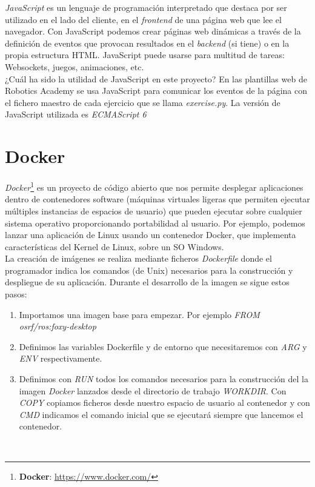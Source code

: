 \textit{JavaScript} es un lenguaje de programación interpretado que destaca por ser utilizado en el lado del cliente, en el \textit{frontend} de una página web que lee el navegador. Con JavaScript podemos crear páginas web dinámicas a través de la definición de eventos que provocan resultados en el \textit{backend} (si tiene) o en la propia estructura HTML. JavaScript puede usarse para multitud de tareas: Websockets, juegos, animaciones, etc.\\

¿Cuál ha sido la utilidad de JavaScript en este proyecto?
En las plantillas web de Robotics Academy se usa JavaScript para comunicar los eventos de la página con el fichero maestro de cada ejercicio que se llama \textit{exercise.py}. La versión de JavaScript utilizada es \textit{ECMAScript 6}



\section{Docker}
\label{sec:docker}

\textit{Docker}\footnote{\textbf{Docker}: \url{https://www.docker.com/}} es un proyecto de código abierto que nos permite desplegar aplicaciones dentro de contenedores software (máquinas virtuales ligeras que permiten ejecutar múltiples instancias de espacios de usuario) que pueden ejecutar sobre cualquier sistema operativo proporcionando portabilidad al usuario. Por ejemplo, podemos lanzar una aplicación de Linux usando un contenedor Docker, que implementa características del Kernel de Linux, sobre un SO Windows.\\

La creación de imágenes se realiza mediante ficheros \textit{Dockerfile} donde el programador indica los comandos (de Unix) necesarios para la construcción y despliegue de su aplicación. Durante el desarrollo de la imagen se sigue estos pasos:\\

\begin{enumerate}
	\item Importamos una imagen base para empezar. Por ejemplo \textit{FROM osrf/ros:foxy-desktop}
	\item Definimos las variables Dockerfile y de entorno que necesitaremos con \textit{ARG} y \textit{ENV} respectivamente.
	\item Definimos con \textit{RUN} todos los comandos necesarios para la construcción del la imagen \textit{Docker} lanzados desde el directorio de trabajo \textit{WORKDIR}. Con \textit{COPY} copiamos ficheros desde nuestro espacio de usuario al contenedor y con \textit{CMD} indicamos el comando inicial que se ejecutará siempre que lancemos el contenedor.
\end{enumerate}\

